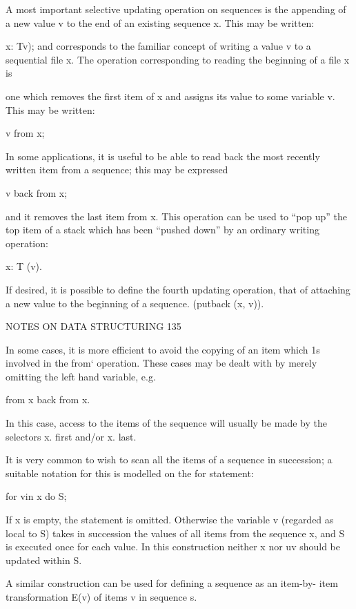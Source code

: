 {{{{				A most important selective updating operation on sequences is the appending of a new value v to the end of an existing sequence x. This may be written:
				
				x: Tv); and corresponds to the familiar concept of writing a value v to a sequential file x. The operation corresponding to reading the beginning of a file x is
				
				one which removes the first item of x and assigns its value to some variable v. This may be written:
				
				v from x;
				
				In some applications, it is useful to be able to read back the most recently written item from a sequence; this may be expressed
				
				v back from x;
				
				and it removes the last item from x. This operation can be used to “pop up” the top item of a stack which has been “pushed down” by an ordinary writing operation:
				
				x: T (v).
				
				If desired, it is possible to define the fourth updating operation, that of attaching a new value to the beginning of a sequence. (putback (x, v)).
				
				NOTES ON DATA STRUCTURING 135
				
				In some cases, it is more efficient to avoid the copying of an item which 1s involved in the from‘ operation. These cases may be dealt with by merely omitting the left hand variable, e.g.
				
				from x back from x.
				
				In this case, access to the items of the sequence will usually be made by the selectors x. first and/or x. last.
				
				It is very common to wish to scan all the items of a sequence in succession; a suitable notation for this is modelled on the for statement:
				
				for vin x do S;
				
				If x is empty, the statement is omitted. Otherwise the variable v (regarded as local to S) takes in succession the values of all items from the sequence x, and S is executed once for each value. In this construction neither x nor uv should be updated within S.
				
				A similar construction can be used for defining a sequence as an item-by- item transformation E(v) of items v in sequence s.
				
}}}}
